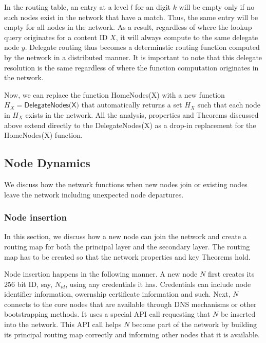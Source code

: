 In the routing table, an entry at a level \(l\) for an digit \(k\) will be empty only if no such nodes exist in the
network that have a match. Thus, the same entry will be empty for all nodes in the network. As a result, regardless of
where the lookup query originates for a content ID \(X\), it will always compute to the same delegate node \(y\).
Delegate routing thus becomes a determinstic routing function computed by the network in a distributed manner. It is
important to note that this delegate resolution is the same regardless of where the function computation originates in the network.

Now, we can replace the function \textsf{HomeNodes(X)} with a new function \(H_X = \textsf{DelegateNodes(X)}\) that automatically returns a
set \(H_X\) such that each node in \(H_X\) exists in the network. All the analysis, properties and Theorems discussed
above extend directly to the \textsf{DelegateNodes(X)} as a drop-in replacement for the \textsf{HomeNodes(X)} function.


\subsection{Node Dynamics}
\label{net:node_dynamics}

We discuss how the network functions when new nodes join or existing nodes leave the network including unexpected node
departures.

\subsubsection{Node insertion}

In this section, we discuss how a new node can join the network and create a routing map for both the principal layer
and the secondary layer. The routing map has to be created so that the network properties and key Theorems hold.

Node insertion happens in the following manner. A new node \(N\) first creates its 256 bit ID,
say, \(N_{id}\), using any credentials it has. Credentials can include node identifier information, owernship
certificate information and such. Next, \( N \) connects to the core nodes that are available through DNS mechanisms or
other bootstrapping methods. It uses a special API call requesting that \(N\) be inserted into the network. This API
call helps \(N\) become part of the network by building its principal routing map correctly and informing other nodes
that it is available.

